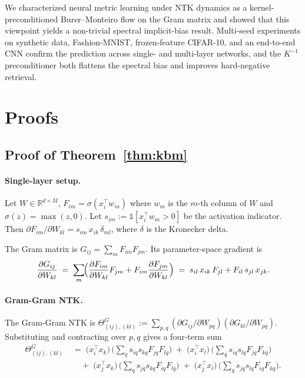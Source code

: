 \documentclass[11pt,letterpaper]{article}
\newcommand{\R}{\mathbb{R}}
\begin{document}
We characterized neural metric learning under NTK dynamics as a
kernel-preconditioned Burer--Monteiro flow on the Gram matrix and showed
that this viewpoint yields a non-trivial spectral implicit-bias result.
Multi-seed experiments on synthetic data, Fashion-MNIST, frozen-feature
CIFAR-10, and an end-to-end CNN confirm the prediction across single- and
multi-layer networks, and the $K^{-1}$ preconditioner both flattens the
spectral bias and improves hard-negative retrieval.




\appendix

\section{Proofs}
\label{app:proofs}

\subsection{Proof of Theorem~\ref{thm:kbm}}

\paragraph{Single-layer setup.}
Let $W \in \R^{d \times M}$, $F_{im} = \sigma(x_i^\top w_m)$ where
$w_m$ is the $m$-th column of $W$ and $\sigma(z) = \max(z, 0)$. Let
$s_{im} := \mathbb{1}[x_i^\top w_m > 0]$ be the activation indicator.
Then $\partial F_{im}/\partial W_{kl} = s_{im}\, x_{ik}\, \delta_{ml}$,
where $\delta$ is the Kronecker delta.

The Gram matrix is $G_{ij} = \sum_m F_{im}F_{jm}$. Its parameter-space
gradient is
\[
\frac{\partial G_{ij}}{\partial W_{kl}}
\;=\; \sum_m \!\Bigl(\frac{\partial F_{im}}{\partial W_{kl}} F_{jm}
+ F_{im}\frac{\partial F_{jm}}{\partial W_{kl}}\Bigr)
\;=\; s_{il}\,x_{ik}\,F_{jl} + F_{il}\,s_{jl}\,x_{jk}.
\]

\paragraph{Gram-Gram NTK.}
The Gram-Gram NTK is
$\Theta^G_{(ij),(kl)} := \sum_{p,q}
(\partial G_{ij}/\partial W_{pq})(\partial G_{kl}/\partial W_{pq})$.
Substituting and contracting over $p, q$ gives a four-term sum
\begin{align*}
\Theta^G_{(ij),(kl)} \;&=\;
\bigl(x_i^\top x_k\bigr)\,\bigl(\textstyle\sum_q s_{iq}s_{kq}F_{jq}F_{lq}\bigr)
\;+\; \bigl(x_i^\top x_l\bigr)\,\bigl(\textstyle\sum_q s_{iq}s_{lq}F_{jq}F_{kq}\bigr) \\
&\quad+\; \bigl(x_j^\top x_k\bigr)\,\bigl(\textstyle\sum_q s_{jq}s_{kq}F_{iq}F_{lq}\bigr)
\;+\; \bigl(x_j^\top x_l\bigr)\,\bigl(\textstyle\sum_q s_{jq}s_{lq}F_{iq}F_{kq}\bigr).
\end{align*}
\end{document}
